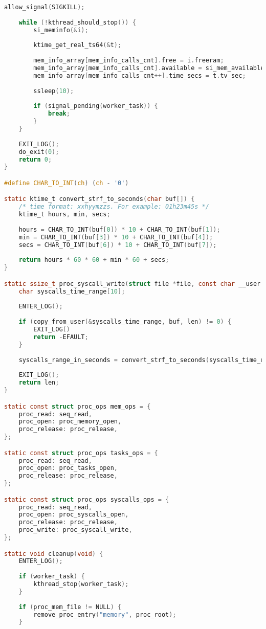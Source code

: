 \begin{lstlisting}[label=lst:monitor_main, caption=Листинг файла monitor\_main.c, language=c]
	allow_signal(SIGKILL);
	
	while (!kthread_should_stop()) {
		si_meminfo(&i);
		
		ktime_get_real_ts64(&t);
		
		mem_info_array[mem_info_calls_cnt].free = i.freeram;
		mem_info_array[mem_info_calls_cnt].available = si_mem_available();
		mem_info_array[mem_info_calls_cnt++].time_secs = t.tv_sec;
		
		ssleep(10);
		
		if (signal_pending(worker_task)) {
			break;
		}
	}
	
	EXIT_LOG();
	do_exit(0);
	return 0;
}

#define CHAR_TO_INT(ch) (ch - '0')

static ktime_t convert_strf_to_seconds(char buf[]) {
	/* time format: xxhyymzzs. For example: 01h23m45s */
	ktime_t hours, min, secs;
	
	hours = CHAR_TO_INT(buf[0]) * 10 + CHAR_TO_INT(buf[1]);
	min = CHAR_TO_INT(buf[3]) * 10 + CHAR_TO_INT(buf[4]);
	secs = CHAR_TO_INT(buf[6]) * 10 + CHAR_TO_INT(buf[7]);
	
	return hours * 60 * 60 + min * 60 + secs;
}

static ssize_t proc_syscall_write(struct file *file, const char __user *buf, size_t len, loff_t *ppos) {
	char syscalls_time_range[10];
	
	ENTER_LOG();
	
	if (copy_from_user(&syscalls_time_range, buf, len) != 0) {
		EXIT_LOG()
		return -EFAULT;
	}
	
	syscalls_range_in_seconds = convert_strf_to_seconds(syscalls_time_range);
	
	EXIT_LOG();
	return len;
}

static const struct proc_ops mem_ops = {
	proc_read: seq_read,
	proc_open: proc_memory_open,
	proc_release: proc_release,
};

static const struct proc_ops tasks_ops = {
	proc_read: seq_read,
	proc_open: proc_tasks_open,
	proc_release: proc_release,
};

static const struct proc_ops syscalls_ops = {
	proc_read: seq_read,
	proc_open: proc_syscalls_open,
	proc_release: proc_release,
	proc_write: proc_syscall_write,
};

static void cleanup(void) {
	ENTER_LOG();
	
	if (worker_task) {
		kthread_stop(worker_task);
	}
	
	if (proc_mem_file != NULL) {
		remove_proc_entry("memory", proc_root);
	}
	

\end{lstlisting}
